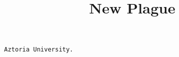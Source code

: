 \documentclass[11pt]{article}
\begin{document}
\title{New Plague}
\maketitle
\texttt{Aztoria University.} 
\end{document}
